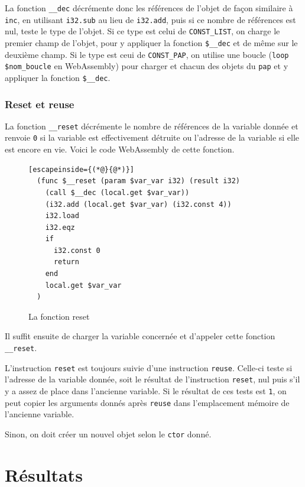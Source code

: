 \documentclass{rapportECL}
\begin{document}
La fonction \verb|__dec| décrémente donc les références de l'objet de façon similaire à \verb|inc|, en utilisant \verb|i32.sub| 
au lieu de \verb|i32.add|, puis si ce nombre de références est nul, teste le type de l'objet. Si ce type est celui de 
\verb|CONST_LIST|, on charge le premier champ de l'objet, pour y appliquer la fonction \verb|$__dec| et de même
sur le deuxième champ. Si le type est ceui de \verb|CONST_PAP|, on utilise une boucle (\verb|loop $nom_boucle| en WebAssembly) pour
charger et chacun des objets du \verb|pap| et y appliquer la fonction \verb|$__dec|.

\subsubsection{Reset et reuse}

La fonction \verb|__reset| décrémente le nombre de références de la variable donnée et renvoie \verb|0| si la variable est 
effectivement détruite ou l'adresse de la variable si elle est encore en vie. Voici le code WebAssembly de cette fonction.

\begin{figure}[H]
	\begin{lstlisting}[escapeinside={(*@}{@*)}]
  (func $__reset (param $var_var i32) (result i32)
    (call $__dec (local.get $var_var))
    (i32.add (local.get $var_var) (i32.const 4))
    i32.load
    i32.eqz
    if
      i32.const 0
      return
    end
    local.get $var_var
  )
	\end{lstlisting}
	\caption{La fonction reset}
	\label{listing:compile_reset}
\end{figure}

Il suffit ensuite de charger la variable concernée et d'appeler cette fonction \verb|__reset|.

\medskip

L'instruction \verb|reset| est toujours suivie d'une instruction \verb|reuse|. Celle-ci teste si l'adresse de la variable donnée, 
soit le résultat de l'instruction \verb|reset|, nul puis s'il y a assez de place dans l'ancienne variable. Si le résultat de ces
tests est \verb|1|, on peut copier les arguments donnés après \verb|reuse| dans l'emplacement mémoire de l'ancienne variable.

Sinon, on doit créer un nouvel objet selon le \verb|ctor| donné.

\section{Résultats}
\end{document}
